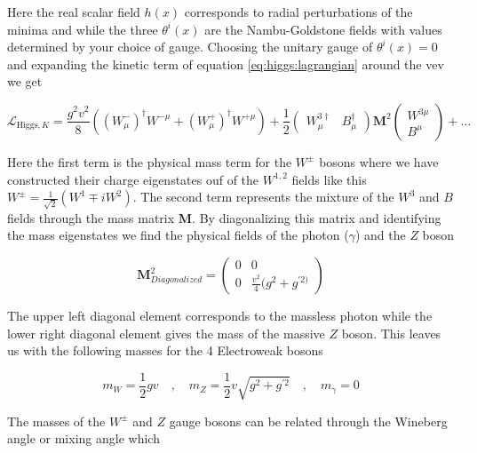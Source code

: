 Here the real scalar field $h(x)$ corresponds to radial perturbations of the
minima and while the three $\theta^{i}(x)$ are the Nambu-Goldstone fields with
values determined by your choice of gauge.  Choosing the unitary gauge of
$\theta^{i}(x) = 0$ and expanding the kinetic term of equation
\ref{eq:higgs:lagrangian} around the vev we get

\begin{equation} \label{eq:higgs:boson_masses}
\mathcal{L}_{\text{Higgs},K} = \frac{g^{2}v^{2}}{8} \left(
(W_{\mu}^{-})^{\dagger}W^{-\mu} + (W_{\mu}^{+})^{\dagger}W^{+\mu} \right) +
\frac{1}{2} \left( \begin{matrix} W_{\mu}^{3\dagger} & B_{\mu}^{\dagger}
\end{matrix} \right) \boldsymbol{M}^{2} \left( \begin{matrix} W^{3\mu} \\ B^{\mu}
\end{matrix} \right) + \ldots 
\end{equation}

Here the first term is the physical mass term for the $W^{\pm}$ bosons where we
have constructed their charge eigenstates ouf of the $W^{1,2}$ fields like this
$W^{\pm} = \frac{1}{\sqrt{2}}(W^{1} \mp iW^{2})$.  The second term represents the
mixture of the $W^{3}$ and $B$ fields through the mass matrix $\boldsymbol{M}$.
By diagonalizing this matrix and identifying the mass eigenstates we find the
physical fields of the photon ($\gamma$) and the $Z$ boson


\begin{equation}
\boldsymbol{M}_{Diagonalized}^{2} = \left( \begin{matrix} 0 & 0 \\ 0 &
\frac{v^{2}}{4}(g^{2} + g^{'2)}   \end{matrix} \right)
\end{equation}

The upper left diagonal element corresponds to the massless photon
while the lower right diagonal element gives the mass of the massive $Z$ boson.
This leaves us with the following masses for the 4 Electroweak bosons

\begin{equation}
m_{W} = \frac{1}{2}gv \quad , \quad m_Z = \frac{1}{2}v\sqrt{g^{2} + g^{'2}}
\quad , \quad m_\gamma = 0
\end{equation}

The masses of the $W^{\pm}$ and $Z$ gauge bosons can be related through the
Wineberg angle or mixing angle which

